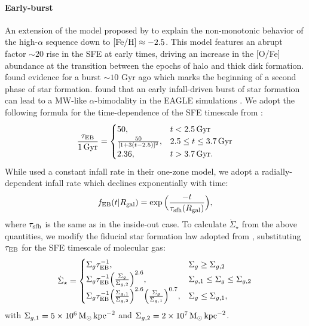 \documentclass[twocolumn,twocolappendix,linenumbers]{aastex631}
\begin{document}
\paragraph{Early-burst} An extension of the model proposed by \citet{Conroy2022-ThickDisk} to explain the non-monotonic behavior of the high-$\alpha$ sequence down to ${\rm [Fe/H]}\approx-2.5$. This model features an abrupt factor $\sim20$ rise in the SFE at early times, driving an increase in the [O/Fe] abundance at the transition between the epochs of halo and thick disk formation. \citet{Stahlholdt2022-StarFormationEpochs} found evidence for a burst $\sim10$ Gyr ago which marks the beginning of a second phase of star formation. \citet{Mackereth2018-AlphaBimodality} found that an early infall-driven burst of star formation can lead to a MW-like $\alpha$-bimodality in the EAGLE simulations \citep{Crain2015-EAGLE,Schaye2015-EAGLE}. We adopt the following formula for the time-dependence of the SFE timescale from \citet{Conroy2022-ThickDisk}:
\begin{equation}
    \frac{\tau_{\rm EB}}{1\,\rm{Gyr}} =
    \begin{cases}
        50, & t < 2.5\,\rm{Gyr} \\
        \frac{50}{[1+3(t-2.5)]^2}, & 2.5\leq t \leq 3.7\,\rm{Gyr} \\
        2.36, & t > 3.7\,\rm{Gyr}.
    \end{cases}
    \label{eq:earlyburst-taustar}
\end{equation}
While \citet{Conroy2022-ThickDisk} used a constant infall rate in their one-zone model, we adopt a radially-dependent infall rate which declines exponentially with time:
\begin{equation}
    f_{\rm EB}(t|R_{\rm gal}) = \exp\Big(\frac{-t}{\tau_{\rm sfh}(R_{\rm gal})}\Big),
    \label{eq:earlyburst-ifr}
\end{equation}
where $\tau_{\rm sfh}$ is the same as in the inside-out case.
To calculate $\dot \Sigma_\star$ from the above quantities, we modify the fiducial star formation law adopted from , substituting $\tau_{\rm EB}$ for the SFE timescale of molecular gas:
\begin{equation}
    \dot \Sigma_\star = 
    \begin{cases}
        \Sigma_g \tau_{\rm EB}^{-1}, & \Sigma_g \geq \Sigma_{g,2} \\
        \Sigma_g \tau_{\rm EB}^{-1} \Big(\frac{\Sigma_g}{\Sigma_{g,2}}\Big)^{2.6}, & \Sigma_{g,1} \leq \Sigma_g \leq \Sigma_{g,2} \\
        \Sigma_g \tau_{\rm EB}^{-1} \Big(\frac{\Sigma_{g,1}}{\Sigma_{g,2}}\Big)^{2.6} \Big(\frac{\Sigma_g}{\Sigma_{g,1}}\Big)^{0.7}, & \Sigma_g \leq \Sigma_{g,1},
    \end{cases}
    \label{eq:earlyburst-sfr}
\end{equation}
with $\Sigma_{g,1}=5\times 10^6\,{\rm M}_\odot\,{\rm kpc}^{-2}$ and $\Sigma_{g,2}=2\times 10^7\,{\rm M}_\odot\,{\rm kpc}^{-2}$.
\end{document}
